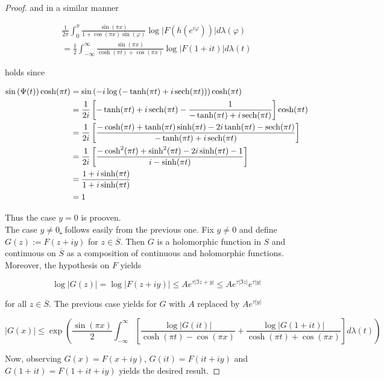 \begin{proof}
and in a similar manner
		
\begin{multline}
	\frac{1}{2\pi} \int_0^\pi \frac{\sin(\pi x)}{1 + \cos(\pi x)\sin(\varphi)} \log \vert F(h(e^{i\varphi}))\vert d\lambda(\varphi)\\ = \frac{1}{2}\int_{-\infty}^\infty\frac{\sin(\pi x)}{\cosh(\pi t) + \cos(\pi x)} \log\vert F(1 + it) \vert d\lambda(t)
\end{multline}

holds since

\begin{gather*}
	\begin{aligned}
		\sin\left(\Psi(t)\right)\cosh(\pi t) &= \sin\left( -i\log\left( -\tanh (\pi t) + i \operatorname{sech}(\pi t) \right)\right) \cosh(\pi t)\\
		&= \frac{1}{2i} \left[ -\tanh(\pi t) + i\operatorname{sech}(\pi t) - \frac{1}{-\tanh(\pi t) + i\operatorname{sech}(\pi t) }\right]\cosh(\pi t)\\
		&= \frac{1}{2i} \left[ \frac{-\cosh(\pi t) + \tanh(\pi t) \sinh(\pi t) - 2i\tanh(\pi t) - \operatorname{sech}(\pi t)}{-\tanh(\pi t) + i\operatorname{sech}(\pi t)}\right]\\
		&= \frac{1}{2i} \left[ \frac{- \cosh^2(\pi t) + \sinh^2(\pi t) - 2i \sinh(\pi t) - 1}{i - \sinh(\pi t)}\right]\\
		&= \frac{1 + i\sinh(\pi t)}{1 + i\sinh(\pi t)}\\
		&= 1
	\end{aligned}
\end{gather*}

Thus the case $y = 0$ is prooven.\\
The case \underline{$y \neq 0$.} follows easily from the previous one. Fix $y \neq 0$ and define $G(z) := F(z + iy)$ for $z \in \overline{S}$. Then $G$ is a holomorphic function in $S$ and continuous on $\overline{S}$ as a composition of continuous and holomorphic functions. Moreover, the hypothesis on $F$ yields

		\begin{equation}
			\log \vert G(z) \vert = \log \vert F(z + iy) \vert \leqslant Ae^{\tau \vert \Im z + y\vert} \leqslant Ae^{\tau \vert \Im z \vert}e^{\tau \vert y \vert}
		\end{equation}

		for all $z \in \overline{S}$. The previous case yields for $G$ with $A$ replaced by $Ae^{\tau\vert y \vert}$

		\begin{equation}
			\vert G(x) \vert \leqslant \exp\left( \frac{\sin(\pi x)}{2} \int_{-\infty}^\infty \left[ \frac{\log \vert G(it)\vert}{\cosh(\pi t) - \cos(\pi x)} + \frac{\log \vert G(1 + it)\vert}{\cosh(\pi t) + \cos(\pi x)} \right] d\lambda(t)\right)
		\end{equation}

		Now, observing $G(x) = F(x + iy)$, $G(it) = F(it + iy)$ and $G(1 + it) = F(1 + it + iy)$ yields the desired result.
\end{proof}

